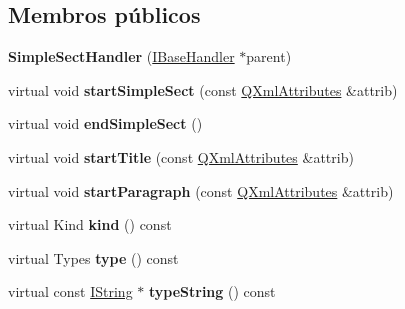 \subsection*{Membros públicos}
\begin{DoxyCompactItemize}
\item 
\hypertarget{class_simple_sect_handler_afde79b6c0eb0cab7a769a19fce7b2ddf}{{\bfseries Simple\-Sect\-Handler} (\hyperlink{class_i_base_handler}{I\-Base\-Handler} $\ast$parent)}\label{class_simple_sect_handler_afde79b6c0eb0cab7a769a19fce7b2ddf}

\item 
\hypertarget{class_simple_sect_handler_a5a59ce1b33a110821e15f0a4141ef9d8}{virtual void {\bfseries start\-Simple\-Sect} (const \hyperlink{class_q_xml_attributes}{Q\-Xml\-Attributes} \&attrib)}\label{class_simple_sect_handler_a5a59ce1b33a110821e15f0a4141ef9d8}

\item 
\hypertarget{class_simple_sect_handler_a845408bbcbfed31523c20fd170dd8b45}{virtual void {\bfseries end\-Simple\-Sect} ()}\label{class_simple_sect_handler_a845408bbcbfed31523c20fd170dd8b45}

\item 
\hypertarget{class_simple_sect_handler_a542aae01d1b2fae60d3c4dd0b77f6669}{virtual void {\bfseries start\-Title} (const \hyperlink{class_q_xml_attributes}{Q\-Xml\-Attributes} \&attrib)}\label{class_simple_sect_handler_a542aae01d1b2fae60d3c4dd0b77f6669}

\item 
\hypertarget{class_simple_sect_handler_abb7f955561480002949ada58092c1964}{virtual void {\bfseries start\-Paragraph} (const \hyperlink{class_q_xml_attributes}{Q\-Xml\-Attributes} \&attrib)}\label{class_simple_sect_handler_abb7f955561480002949ada58092c1964}

\item 
\hypertarget{class_simple_sect_handler_af8e62c8a81ddf2283205cc8955de50eb}{virtual Kind {\bfseries kind} () const }\label{class_simple_sect_handler_af8e62c8a81ddf2283205cc8955de50eb}

\item 
\hypertarget{class_simple_sect_handler_ada76a4f391850a616335245f2634b41c}{virtual Types {\bfseries type} () const }\label{class_simple_sect_handler_ada76a4f391850a616335245f2634b41c}

\item 
\hypertarget{class_simple_sect_handler_a0b83e685101612077522408e5adce410}{virtual const \hyperlink{class_i_string}{I\-String} $\ast$ {\bfseries type\-String} () const }\label{class_simple_sect_handler_a0b83e685101612077522408e5adce410}


\end{DoxyCompactItemize}
